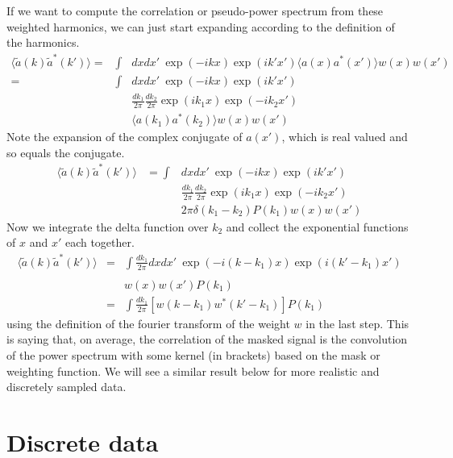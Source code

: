 If we want to compute the correlation or pseudo-power spectrum from these weighted harmonics, we can just start expanding according to the definition of the harmonics.
\begin{eqnarray}
  \langle \tilde a(k) \tilde a^*(k') \rangle = &\int& dx dx' \ \exp(-i k x)\exp(i k' x') \langle a(x) a^*(x') \rangle w(x) w(x')  \nonumber \\
  = &\int &dx dx' \ \exp(-i k x)\exp(i k' x')  \nonumber \\
  & & \frac{dk_1}{2\pi} \frac{dk_2}{2\pi} \exp(i k_1 x)\exp(-i k_2 x')  \nonumber \\
  & & \langle a(k_1) a^*(k_2) \rangle w(x) w(x')  
\end{eqnarray}
Note the expansion of the complex conjugate of $a(x')$, which is real valued and so equals the conjugate.
 \begin{eqnarray}
   \langle \tilde a(k) \tilde a^*(k') \rangle  &= \int &dx dx' \ \exp(-i k x)\exp(i k' x')  \nonumber \\
  & &\frac{dk_1}{2\pi} \frac{dk_2}{2\pi} \exp(i k_1 x)\exp(-i k_2 x')  \nonumber \\
  & & 2\pi \delta(k_1 - k_2) P(k_1) w(x) w(x') 
\end{eqnarray}
Now we integrate the delta function over $k_2$ and collect the exponential functions of $x$ and $x'$ each together.
 \begin{eqnarray}
   \langle \tilde a(k) \tilde a^*(k') \rangle  &= & \int\frac{dk_1}{2\pi} dx dx' \ \exp(-i (k - k_1) x)\exp(i (k'-k_1) x')  \nonumber \\
  & &  \nonumber \\
   & &  w(x) w(x') P(k_1) \nonumber \\
   &=&  \int\frac{dk_1}{2\pi} \left[  w(k-k_1) w^*(k'-k_1) \right] P(k_1) %
\end{eqnarray}
using the definition of the fourier transform of the weight $w$ in the last step.  This is saying that, on average, the correlation of the masked signal is the convolution of the power spectrum with some kernel (in brackets) based on the mask or weighting function.  We will see a similar result below for more realistic and discretely sampled data.

\section{Discrete data}

